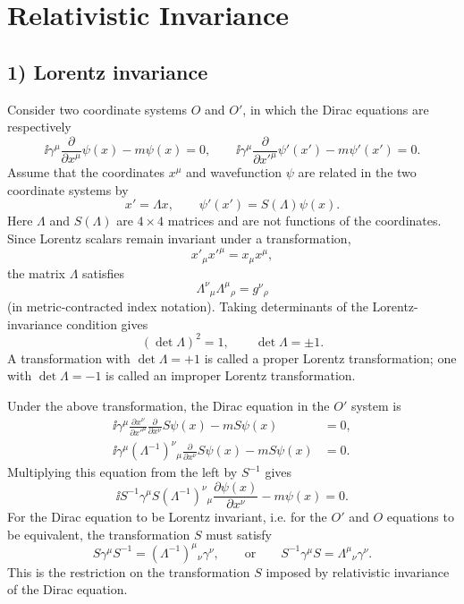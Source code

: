 \section{Relativistic Invariance}
\subsection*{1) Lorentz invariance}
Consider two coordinate systems $O$ and $O'$, in which the Dirac equations are respectively
\[
\ii\gamma^\mu\frac{\partial}{\partial x^\mu}\psi(x)-m\psi(x)=0,
\qquad
\ii\gamma^\mu\frac{\partial}{\partial x'^\mu}\psi'(x')-m\psi'(x')=0.
\]
Assume that the coordinates $x^\mu$ and wavefunction $\psi$ are related in the two coordinate systems by
\[
x'=\Lambda x,\qquad \psi'(x')=S(\Lambda)\psi(x).
\]
Here $\Lambda$ and $S(\Lambda)$ are $4\times4$ matrices and are not functions of the coordinates. Since Lorentz scalars remain invariant under a transformation,
\[
x'_\mu x'^\mu=x_\mu x^\mu,
\]
the matrix $\Lambda$ satisfies
\[
\Lambda^\nu{}_{\mu}\Lambda^\mu{}_{\rho}=g^\nu{}_{\rho}
\]
(in metric-contracted index notation). Taking determinants of the Lorentz-invariance condition gives
\[
(\det\Lambda)^2=1,\qquad\det\Lambda=\pm1.
\]
A transformation with $\det\Lambda=+1$ is called a proper Lorentz transformation; one with $\det\Lambda=-1$ is called an improper Lorentz transformation.

Under the above transformation, the Dirac equation in the $O'$ system is
\begin{align*}
\ii\gamma^\mu\frac{\partial x^\nu}{\partial x'^\mu}
\frac{\partial}{\partial x^\nu}S\psi(x)-mS\psi(x)&=0,\\
\ii\gamma^\mu(\Lambda^{-1})^\nu{}_{\mu}
\frac{\partial}{\partial x^\nu}S\psi(x)-mS\psi(x)&=0.
\end{align*}
Multiplying this equation from the left by $S^{-1}$ gives
\[
\ii S^{-1}\gamma^\mu S(\Lambda^{-1})^\nu{}_{\mu}
\frac{\partial\psi(x)}{\partial x^\nu}-m\psi(x)=0.
\]
For the Dirac equation to be Lorentz invariant, i.e. for the $O'$ and $O$ equations to be equivalent, the transformation $S$ must satisfy
\[
S\gamma^\mu S^{-1}=(\Lambda^{-1})^\mu{}_{\nu}\gamma^\nu,
\qquad\text{or}\qquad S^{-1}\gamma^\mu S=\Lambda^\mu{}_{\nu}\gamma^\nu.
\]
This is the restriction on the transformation $S$ imposed by relativistic invariance of the Dirac equation.

